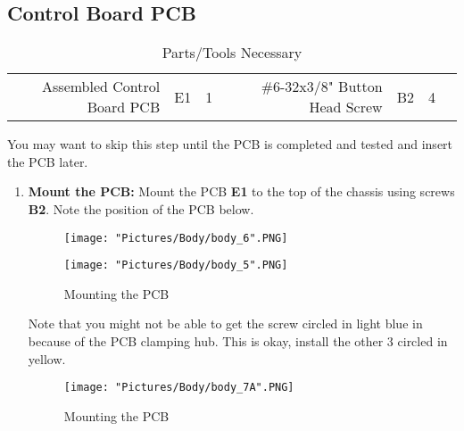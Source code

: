 \documentclass[12pt]{article}
\begin{document}
\subsection{Control Board PCB}

\begin{table}[H]
    \centering
    \sffamily\footnotesize
    \caption{Parts/Tools Necessary}
    \begin{tabular}{|N|Q|Q|I|N|Q|Q|I|}
        \hline
         &  &  &  &  &  &  &  \\
        \hline
        Assembled Control Board PCB  & E1 & 1 &  & \#6-32x3/8" Button Head Screw & B2 & 4 &  \\ \hline
    \end{tabular}
\end{table}

You may want to skip this step until the PCB is completed and tested and insert the PCB later. 

\begin{enumerate}

\item \textbf{Mount the PCB:} Mount the PCB \textbf{E1} to the top of the chassis using screws \textbf{B2}. Note the position of the PCB below.

\begin{figure}[H]
  \centering
  \begin{minipage}[b]{0.50\textwidth}
    \texttt{[image: "Pictures/Body/body\_6".PNG]}
  \end{minipage}
  \hfill
  \begin{minipage}[b]{0.40\textwidth}
    \texttt{[image: "Pictures/Body/body\_5".PNG]}
  \end{minipage}
  \caption{Mounting the PCB}
  \label{pcb}
\end{figure}

Note that you might not be able to get the screw circled in light blue in because of the PCB clamping hub. This is okay, install the other 3 circled in yellow. 

\begin{figure}[H]
	\centering
	\texttt{[image: "Pictures/Body/body\_7A".PNG]}
	\caption{Mounting the PCB}
\end{figure}

\end{enumerate}
\end{document}
